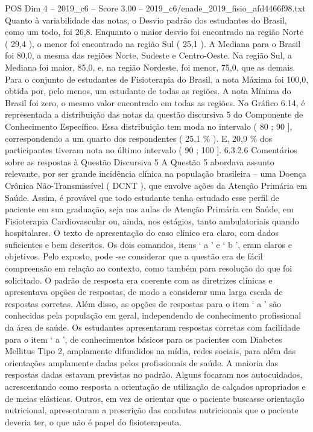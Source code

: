 \begin{textsample}{POS Dim 4 – 2019\_c6 – Score 3.00 – 2019\_c6/enade\_2019\_fisio\_afd4466f98.txt}
Quanto à variabilidade das notas, o Desvio padrão dos estudantes do Brasil, como um todo, foi 26,8.
Enquanto o maior desvio foi encontrado na região Norte ( 29,4 ), o menor foi encontrado na região Sul ( 25,1 ).
A Mediana para o Brasil foi 80,0, a mesma das regiões Norte, Sudeste e Centro-Oeste.
Na região Sul, a Mediana foi maior, 85,0, e, na região Nordeste, foi menor, 75,0, que as demais.
Para o conjunto de estudantes de Fisioterapia do Brasil, a nota Máxima foi 100,0, obtida por, pelo menos, um estudante de todas as regiões.
A nota Mínima do Brasil foi zero, o mesmo valor encontrado em todas as regiões.
No Gráfico 6.14, é representada a distribuição das notas da questão discursiva 5 do Componente de Conhecimento Específico.
Essa distribuição tem moda no intervalo ( 80 ; 90 ], correspondendo a um quarto dos respondentes ( 25,1 \% ).
E, 20,9 \% dos participantes tiveram nota no último intervalo ( 90 ; 100 ]. 6.3.2.6 Comentários sobre as respostas à Questão Discursiva 5 A Questão 5 abordava assunto relevante, por ser grande incidência clínica na população brasileira – uma Doença Crônica Não-Transmissível ( DCNT ), que envolve ações da Atenção Primária em Saúde.
Assim, é provável que todo estudante tenha estudado esse perfil de paciente em sua graduação, seja nas aulas de Atenção Primária em Saúde, em Fisioterapia Cardiovascular ou, ainda, nos estágios, tanto ambulatoriais quando hospitalares.
O texto de apresentação do caso clínico era claro, com dados suficientes e bem descritos.
Os dois comandos, itens ‘ a ’ e ‘ b ’, eram claros e objetivos.
Pelo exposto, pode -se considerar que a questão era de fácil compreensão em relação ao contexto, como também para resolução do que foi solicitado.
O padrão de resposta era coerente com as diretrizes clínicas e apresentava opções de respostas, de modo a considerar uma larga escala de respostas corretas.
Além disso, as opções de respostas para o item ‘ a ’ são conhecidas pela população em geral, independendo de conhecimento profissional da área de saúde.
Os estudantes apresentaram respostas corretas com facilidade para o item ‘ a ’, de conhecimentos básicos para os pacientes com Diabetes Mellitus Tipo 2, amplamente difundidos na mídia, redes sociais, para além das orientações amplamente dadas pelos profissionais de saúde.
A maioria das respostas dadas estavam previstas no padrão.
Alguns focaram nos autocuidados, acrescentando como resposta a orientação de utilização de calçados apropriados e de meias elásticas.
Outros, em vez de orientar que o paciente buscasse orientação nutricional, apresentaram a prescrição das condutas nutricionais que o paciente deveria ter, o que não é papel do fisioterapeuta.

\end{textsample}
